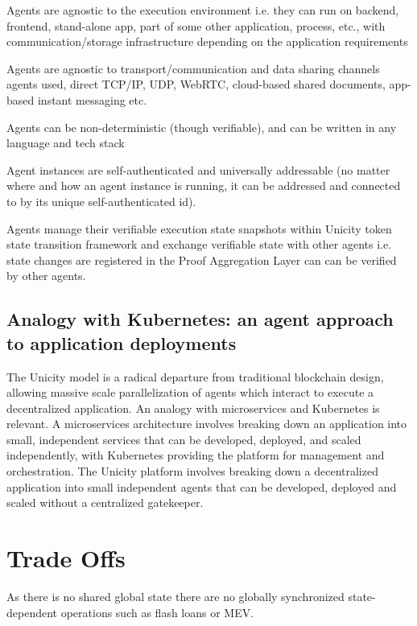 \documentclass{article}
\begin{document}
Agents are agnostic to the execution environment i.e. they can run on backend, frontend, stand-alone app, part of some other application, process, etc., with communication/storage infrastructure depending on the application requirements

Agents are agnostic to transport/communication and data sharing channels agents  used, direct TCP/IP, UDP, WebRTC, cloud-based shared documents, app-based instant messaging  etc. 

Agents can be non-deterministic (though verifiable), and can be written in any language and tech stack

Agent instances are self-authenticated and universally addressable (no matter where and how an agent instance is running, it can be addressed and connected to by its unique self-authenticated id). 

Agents manage their verifiable execution state snapshots within Unicity token state transition framework and exchange verifiable state with other agents i.e. state changes are registered in the Proof Aggregation Layer can can be verified by other agents.





\subsection{Analogy with Kubernetes: an agent approach to application deployments}

The Unicity model is a radical departure from traditional blockchain design, allowing massive scale parallelization of agents which interact to execute a decentralized application. An analogy with microservices and Kubernetes is relevant. A microservices architecture involves breaking down an application into small, independent services that can be developed, deployed, and scaled independently, with Kubernetes providing the platform for management and orchestration. The Unicity platform involves breaking down a decentralized application into small independent agents that can be developed, deployed and scaled without a centralized gatekeeper.


\section{Trade Offs}

As there is no shared global state there are no globally synchronized state-dependent operations such as flash loans or MEV.
\end{document}
